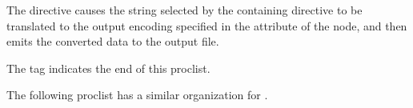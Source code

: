 \documentclass[letterpaper,12pt,english,openany,oneside]{sphinxmanual}
\begin{document}
The  directive causes the string selected by the containing  directive to be translated to the output encoding specified in the  attribute of the  node, and then emits the converted data to the output file.

\begin{sphinxVerbatim}[commandchars=\\\{\}]
               
\end{sphinxVerbatim}

The  tag indicates the end of this proc\sphinxhyphen{}list.

The following proc\sphinxhyphen{}list has a similar organization for .
\end{document}

